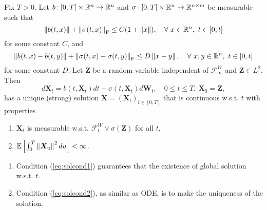 \begin{thm}
    Fix $T > 0$. Let $b \colon [0,T] \times \mathbb{R}^n \rightarrow \mathbb{R}^n$ and $\sigma \colon [0,T] \times \mathbb{R}^n \rightarrow \mathbb{R}^{n \times m}$ be measurable such that
    \begin{equation}\label{eq:solcond1}
        \left\lVert b(t,x)\right\lVert + \left\lVert\sigma(t,x)\right\lVert_{\operatorname{F}} \leq C(1 + \left\lVert x\right\lVert), \quad \forall~x \in \mathbb{R}^n,~t \in [0,t]
    \end{equation}
    for some constant $C$, and
    \begin{equation}\label{eq:solcond2}
        \left\lVert b(t,x)-b(t,y)\right\lVert + \left\lVert\sigma(t,x)-\sigma(t,y)\right\lVert_{\operatorname{F}} \leq D\left\lVert x-y\right\lVert,\quad \forall~x,y \in \mathbb{R}^n,~t \in [0,t]
    \end{equation}
    for some constant $D$. Let $\bm{Z}$ be a random variable independent of $\mathcal{F}^W_\infty$ and $\bm{Z} \in L^2$. Then
    \begin{equation*}
        d\bm{X}_t = b(t,\bm{X}_t)dt+\sigma(t,\bm{X}_t)d\bm{W}_t,\quad 0\leq t \leq T,~\bm{X}_0 = \bm{Z},
    \end{equation*}
    has a unique (strong) solution $\bm{X}=(\bm{X}_t)_{t \in [0,T]}$ that is continuous w.s.t. $t$ with properties
    \begin{enumerate}[label=(\roman*)]
        \item $\bm{X}_t$ is measurable w.s.t. $\mathcal{F}^W_t \vee \sigma(\bm{Z})$ for all $t$,
        \item $\mathbb{E}\left[\int_0^T\left\lVert\bm{X}_u\right\lVert^2du\right] < \infty$.
    \end{enumerate}
\end{thm}
\begin{rmk}
    \begin{enumerate}[label=(\arabic{*})]
        \item Condition (\ref{eq:solcond1}) guarantees that the existence of global solution w.s.t. $t$.
        \item Condition (\ref{eq:solcond2}), as similar as ODE, is to make the uniqueness of the solution.
    \end{enumerate}
\end{rmk}

